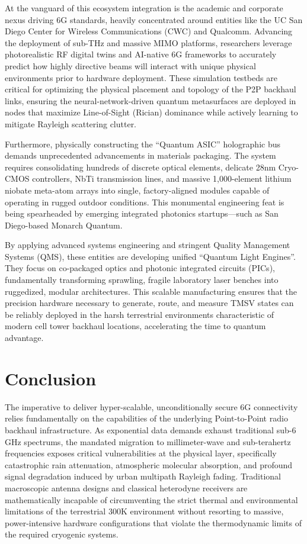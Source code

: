 \documentclass[11pt,a4paper]{article}
\begin{document}
At the vanguard of this ecosystem integration is the academic and corporate nexus driving 6G standards, heavily concentrated around entities like the UC San Diego Center for Wireless Communications (CWC) and Qualcomm.\cite{ref60} Advancing the deployment of sub-THz and massive MIMO platforms, researchers leverage photorealistic RF digital twins and AI-native 6G frameworks to accurately predict how highly directive beams will interact with unique physical environments prior to hardware deployment.\cite{ref15} These simulation testbeds are critical for optimizing the physical placement and topology of the P2P backhaul links, ensuring the neural-network-driven quantum metasurfaces are deployed in nodes that maximize Line-of-Sight (Rician) dominance while actively learning to mitigate Rayleigh scattering clutter.\cite{ref19}

Furthermore, physically constructing the ``Quantum ASIC'' holographic bus demands unprecedented advancements in materials packaging. The system requires consolidating hundreds of discrete optical elements, delicate 28nm Cryo-CMOS controllers, NbTi transmission lines, and massive 1,000-element lithium niobate meta-atom arrays into single, factory-aligned modules capable of operating in rugged outdoor conditions.\cite{ref6} This monumental engineering feat is being spearheaded by emerging integrated photonics startups---such as San Diego-based Monarch Quantum.\cite{ref64}

By applying advanced systems engineering and stringent Quality Management Systems (QMS), these entities are developing unified ``Quantum Light Engines''.\cite{ref66} They focus on co-packaged optics and photonic integrated circuits (PICs), fundamentally transforming sprawling, fragile laboratory laser benches into ruggedized, modular architectures.\cite{ref64} This scalable manufacturing ensures that the precision hardware necessary to generate, route, and measure TMSV states can be reliably deployed in the harsh terrestrial environments characteristic of modern cell tower backhaul locations, accelerating the time to quantum advantage.\cite{ref65}

\section{Conclusion}

The imperative to deliver hyper-scalable, unconditionally secure 6G connectivity relies fundamentally on the capabilities of the underlying Point-to-Point radio backhaul infrastructure. As exponential data demands exhaust traditional sub-6 GHz spectrums, the mandated migration to millimeter-wave and sub-terahertz frequencies exposes critical vulnerabilities at the physical layer, specifically catastrophic rain attenuation, atmospheric molecular absorption, and profound signal degradation induced by urban multipath Rayleigh fading. Traditional macroscopic antenna designs and classical heterodyne receivers are mathematically incapable of circumventing the strict thermal and environmental limitations of the terrestrial 300K environment without resorting to massive, power-intensive hardware configurations that violate the thermodynamic limits of the required cryogenic systems.
\end{document}
